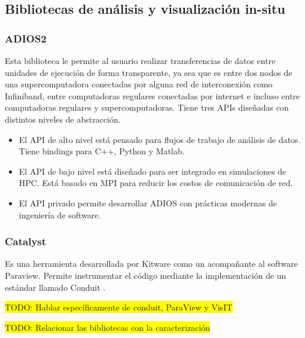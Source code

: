 \subsection{Bibliotecas de análisis y visualización in-situ}
\subsubsection{ADIOS2}
  Esta biblioteca \cite{Godoy2020} le permite al usuario realizar transferencias de datos entre unidades de ejecución de forma transparente, ya sea que es entre dos nodos de una supercomputadora conectadas por alguna red de interconexión como Infiniband, entre computadoras regulares conectadas por internet e incluso entre computadoras regulares y supercomputadoras.
  Tiene tres APIs diseñadas con distintos niveles de abstracción.
  \begin{itemize}
    \item El API de alto nivel está pensado para flujos de trabajo de análisis de datos. Tiene bindings para C++, Python y Matlab.
    \item El API de bajo nivel está diseñado para ser integrado en simulaciones de HPC. Está basado en MPI para reducir los costos de comunicación de red.
    \item El API privado permite desarrollar ADIOS con prácticas modernas de ingeniería de software.
  \end{itemize}
\subsubsection{Catalyst}
Es una herramienta desarrollada por Kitware como un acompañante al software Paraview. Permite instrumentar el código mediante la implementación de un estándar llamado Conduit \cite{Ayachit2021}.


\colorbox{yellow}{TODO: Hablar específicamente de conduit, ParaView y VisIT}

\colorbox{yellow}{TODO: Relacionar las bibliotecas con la caracterización}
